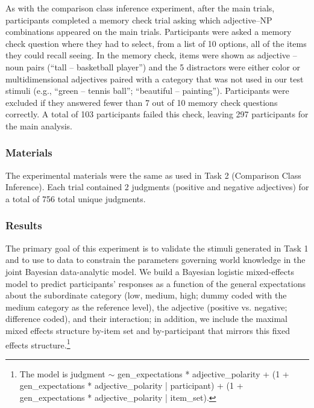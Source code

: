\documentclass[doc]{apa6}
\begin{document}
As with the comparison class inference experiment, after the main trials, participants completed a memory check trial asking which adjective--NP combinations appeared on the main trials. 
Participants were asked a memory check question where they had to select, from a list of 10 options, all of the items they could recall seeing. In the memory check, items were shown as adjective -- noun pairs (``tall -- basketball player'') and the 5 distractors were either color or multidimensional adjectives paired with a category that was not used in our test stimuli (e.g., ``green -- tennis ball''; ``beautiful -- painting'').
Participants were excluded if they answered fewer than 7 out of 10 memory check questions correctly.
A total of 103 participants failed this check, leaving 297 participants for the main analysis. 

\subsubsection{Materials}

The experimental materials were the same as used in Task 2 (Comparison Class Inference).
Each trial contained 2 judgments (positive and negative adjectives) for a total of 756 total unique judgments.

\subsubsection{Results}

The primary goal of this experiment is to validate the stimuli generated in Task 1 and to use to data to constrain the parameters governing world knowledge in the joint Bayesian data-analytic model. We build a Bayesian logistic mixed-effects model to predict participants' responses as a function of the general expectations about the subordinate category (low, medium, high; dummy coded with the medium category as the reference level), the adjective (positive vs. negative; difference coded), and their interaction; in addition, we include the maximal mixed effects structure by-item set and by-participant that mirrors this fixed effects structure.\footnote{
The model is judgment $\sim$ gen\_expectations * adjective\_polarity + (1 + gen\_expectations * adjective\_polarity | participant) + (1 + gen\_expectations * adjective\_polarity | item\_set).
}
\end{document}
